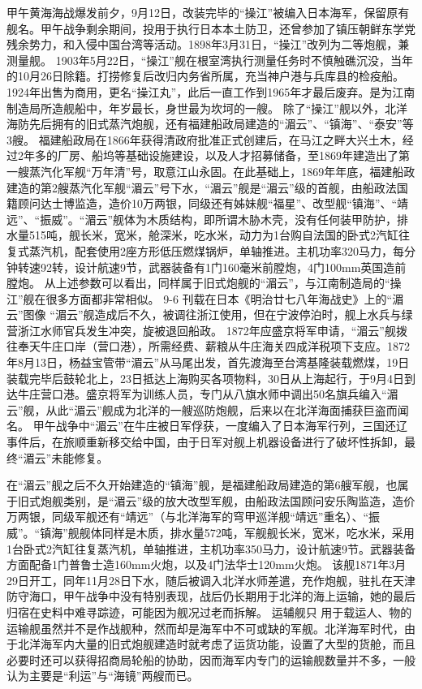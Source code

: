 \documentclass[12pt,UTF8]{ctexbook}
\begin{document}
甲午黄海海战爆发前夕，9月12日，改装完毕的“操江”被编入日本海军，保留原有舰名。甲午战争剩余期间，投用于执行日本本土防卫，还曾参加了镇压朝鲜东学党残余势力，和入侵中国台湾等活动。1898年3月31日，“操江”改列为二等炮舰，兼测量舰。
1903年5月22日，“操江”舰在根室湾执行测量任务时不慎触礁沉没，当年的10月26日除籍。打捞修复后改归内务省所属，充当神户港与兵库县的检疫船。1924年出售为商用，更名“操江丸”，此后一直工作到1965年才最后废弃。是为江南制造局所造舰船中，年岁最长，身世最为坎坷的一艘。
除了“操江”舰以外，北洋海防先后拥有的旧式蒸汽炮舰，还有福建船政局建造的“湄云”、“镇海”、“泰安”等3艘。
福建船政局在1866年获得清政府批准正式创建后，在马江之畔大兴土木，经过2年多的厂房、船坞等基础设施建设，以及人才招募储备，至1869年建造出了第一艘蒸汽化军舰“万年清”号，取意江山永固。在此基础上，1869年年底，福建船政建造的第2艘蒸汽化军舰“湄云”号下水，“湄云”舰是“湄云”级的首舰，由船政法国籍顾问达士博监造，造价10万两银，同级还有姊妹舰“福星”、改型舰“镇海”、“靖远”、“振威”。“湄云”舰体为木质结构，即所谓木胁木壳，没有任何装甲防护，排水量515吨，舰长米，宽米，舱深米，吃水米，动力为1台购自法国的卧式2汽缸往复式蒸汽机，配套使用2座方形低压燃煤锅炉，单轴推进。主机功率320马力，每分钟转速92转，设计航速9节，武器装备有1门160毫米前膛炮，4门100mm英国造前膛炮。 从上述参数可以看出，同样属于旧式炮舰的“湄云”，与江南制造局的“操江”舰在很多方面都非常相似。
9-6 刊载在日本《明治廿七八年海战史》上的“湄云”图像
“湄云”舰造成后不久，被调往浙江使用，但在宁波停泊时，舰上水兵与绿营浙江水师官兵发生冲突，旋被退回船政。 1872年应盛京将军申请，“湄云”舰拨往奉天牛庄口岸（营口港），所需经费、薪粮从牛庄海关四成洋税项下支应。1872年8月13日，杨益宝管带“湄云”从马尾出发，首先渡海至台湾基隆装载燃煤，19日装载完毕后鼓轮北上，23日抵达上海购买各项物料，30日从上海起行，于9月4日到达牛庄营口港。盛京将军为训练人员，专门从八旗水师中调出50名旗兵编入“湄云”舰，从此“湄云”舰成为北洋的一艘巡防炮舰，后来以在北洋海面捕获巨盗而闻名。 甲午战争中“湄云”在牛庄被日军俘获，一度编入了日本海军行列，三国还辽事件后，在旅顺重新移交给中国，由于日军对舰上机器设备进行了破坏性拆卸，最终“湄云”未能修复。


在“湄云”舰之后不久开始建造的“镇海”舰，是福建船政局建造的第6艘军舰，也属于旧式炮舰类别，是“湄云”级的放大改型军舰，由船政法国顾问安乐陶监造，造价万两银，同级军舰还有“靖远”（与北洋海军的穹甲巡洋舰“靖远”重名）、“振威”。“镇海”舰舰体同样是木质，排水量572吨，军舰舰长米，宽米，吃水米，采用1台卧式2汽缸往复蒸汽机，单轴推进，主机功率350马力，设计航速9节。武器装备方面配备1门普鲁士造160mm火炮，以及4门法华士120mm火炮。 该舰1871年3月29日开工，同年11月28日下水，随后被调入北洋水师差遣，充作炮舰，驻扎在天津防守海口，甲午战争中没有特别表现，战后仍长期用于北洋的海上运输，她的最后归宿在史料中难寻踪迹，可能因为舰况过老而拆解。
运辅舰只
用于载运人、物的运输舰虽然并不是作战舰种，然而却是海军中不可或缺的军舰。北洋海军时代，由于北洋海军内大量的旧式炮舰建造时就考虑了运货功能，设置了大型的货舱，而且必要时还可以获得招商局轮船的协助，因而海军内专门的运输舰数量并不多，一般认为主要是“利运”与“海镜”两艘而已。
\end{document}
